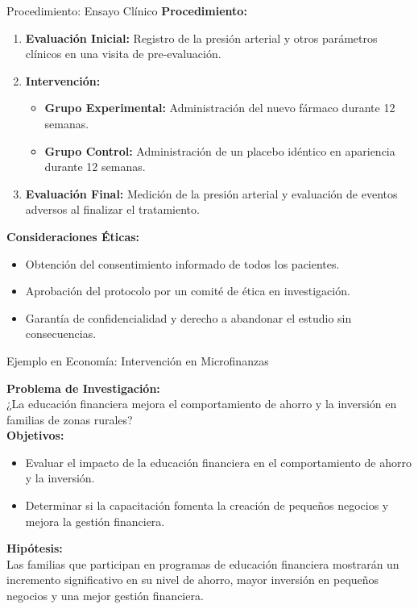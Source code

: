 ﻿\documentclass{beamer}
\begin{document}
\begin{frame}{Procedimiento: Ensayo Clínico}
  \textbf{Procedimiento:}
  \begin{enumerate}
      \item \textbf{Evaluación Inicial:} Registro de la presión arterial y otros parámetros clínicos en una visita de pre-evaluación.
      \item \textbf{Intervención:}
      \begin{itemize}
          \item \textbf{Grupo Experimental:} Administración del nuevo fármaco durante 12 semanas.
          \item \textbf{Grupo Control:} Administración de un placebo idéntico en apariencia durante 12 semanas.
      \end{itemize}
      \item \textbf{Evaluación Final:} Medición de la presión arterial y evaluación de eventos adversos al finalizar el tratamiento.
  \end{enumerate}
  
  \vspace{2mm}
  \textbf{Consideraciones Éticas:}
  \begin{itemize}
      \item Obtención del consentimiento informado de todos los pacientes.
      \item Aprobación del protocolo por un comité de ética en investigación.
      \item Garantía de confidencialidad y derecho a abandonar el estudio sin consecuencias.
  \end{itemize}
  
\end{frame}


\begin{frame}{Ejemplo en Economía: Intervención en Microfinanzas}
  
  \textbf{Problema de Investigación:}\\
  ¿La educación financiera mejora el comportamiento de ahorro y la inversión en familias de zonas rurales?\\[3mm]
  
  \textbf{Objetivos:}
  \begin{itemize}
      \item Evaluar el impacto de la educación financiera en el comportamiento de ahorro y la inversión.
      \item Determinar si la capacitación fomenta la creación de pequeños negocios y mejora la gestión financiera.
  \end{itemize}
  
  \textbf{Hipótesis:}\\
  Las familias que participan en programas de educación financiera mostrarán un incremento significativo en su nivel de ahorro, mayor inversión en pequeños negocios y una mejor gestión financiera.
\end{frame}
\end{document}
